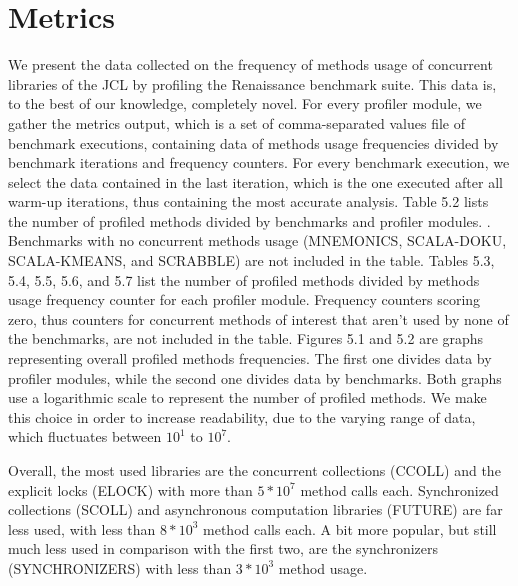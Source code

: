 \documentclass[]{usiinfthesis}
\begin{document}
\section{Metrics}
We present the data collected on the frequency of methods usage of concurrent libraries of the JCL by profiling the Renaissance benchmark suite.  This data is, to the best of our knowledge, completely novel. For every profiler module, we gather the metrics output, which is a set of comma-separated values file of benchmark executions, containing data of methods usage frequencies divided by benchmark iterations and frequency counters. For every benchmark execution, we select the data contained in the last iteration, which is the one executed after all warm-up iterations, thus containing the most accurate analysis. Table 5.2 lists the number of profiled methods divided by benchmarks and profiler modules. . Benchmarks with no concurrent methods usage (MNEMONICS, SCALA-DOKU, SCALA-KMEANS, and SCRABBLE) are not included in the table. Tables 5.3, 5.4, 5.5, 5.6, and 5.7 list the number of profiled methods divided by methods usage frequency counter for each profiler module. Frequency counters scoring zero, thus counters for concurrent methods of interest that aren't used by none of the benchmarks, are not included in the table. Figures 5.1 and 5.2 are graphs representing overall profiled methods frequencies. The first one divides data by profiler modules, while the second one divides data by benchmarks. Both graphs use a logarithmic scale to represent the number of profiled methods. We make this choice in order to increase readability, due to the varying range of data, which fluctuates between \(10^1\) to \(10^7\). 

Overall, the most used libraries are the concurrent collections (CCOLL) and the explicit locks (ELOCK) with more than \(5*10^7\) method calls each. Synchronized collections (SCOLL) and asynchronous computation libraries (FUTURE) are far less used, with less than \(8*10^3\) method calls each. A bit more popular, but still much less used in comparison with the first two, are the synchronizers (SYNCHRONIZERS) with less than \(3*10^3\) method usage.
\end{document}
